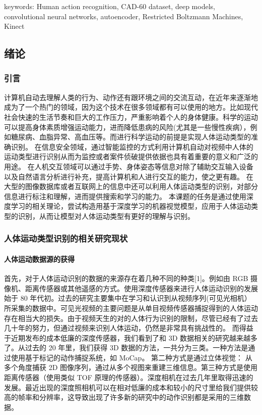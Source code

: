 keywords: Human action recognition, CAD-60 dataset, deep models,
convolutional neural networks, autoencoder, Restricted Boltzmann
Machines, Kinect

\subsection{绪论}\label{ux7eeaux8bba}

\subsubsection{引言}\label{ux5f15ux8a00}

计算机自动去理解人类的行为、动作还有跟环境之间的交流互动，在近年来逐渐地成为了一个热门的领域，因为这个技术在很多领域都有可以使用的地方。比如现代社会快速的生活节奏和巨大的工作压力，严重影响着个人的身体健康。科学的运动可以提高身体素质增强运动能力，进而降低患病的风险(尤其是一些慢性疾病），例如糖尿病、血脂异常、高血压等。而进行科学运动的前提是实现人体运动类型的准确识别。
在信息安全领域，通过智能监控的方式利用计算机自动对视频中人体的运动类型进行识别从而为监控或者案件侦破提供依据也具有着重要的意义和广泛的用途。
在人机交互领域可以通过手势、身体姿态等信息对除了辅助交互输入设备以及自然语言分析进行补充，提高计算机和人进行交互的能力，使之更有趣。
在大型的图像数据库或者互联网上的信息中还可以利用人体运动类型的识别，对部分信息进行标注和理解，进而提供搜索和学习的能力。
本课题的任务是通过使用深度学习的相关理论，尝试构造用基于深度学习的机器视觉模型，应用于人体运动类型的识别，从而让模型对人体运动类型有更好的理解与识别。

\subsubsection{人体运动类型识别的相关研究现状}\label{ux4ebaux4f53ux8fd0ux52a8ux7c7bux578bux8bc6ux522bux7684ux76f8ux5173ux7814ux7a76ux73b0ux72b6}

\paragraph{人体运动数据源的获得}\label{ux4ebaux4f53ux8fd0ux52a8ux6570ux636eux6e90ux7684ux83b7ux5f97}

首先，对于人体运动识别的数据的来源存在着几种不同的种类{[}1{]}。例如由
RGB
摄像机、距离传感器或其他遥感的方式。使用深度传感器来进行人体运动识别的发展始于
80
年代初。过去的研究主要集中在学习和认识到从视频序列(可见光相机）所采集的数据中。可见光视频的主要问题是从单目视频传感器捕捉得到的人体运动存在相当大的损失。由于视频天生的对的人体行为识别的限制，尽管已经有了过去几十年的努力，但通过视频来识别人体运动，仍然是非常具有挑战性的。
而得益于近期发布的成本低廉的深度传感器，我们看到了和 3D
数据相关的研究越来越多了。从过去的 20 年里，我们获得 3D
数据的方法，一共分为三类。一种方法是通过使用基于标记的动作捕捉系统，如
MoCap。 第二种方式是通过立体视觉： 从多个角度捕获 2D
图像序列，通过从多个视图来重建三维信息。第三种方式是使用距离传感器（使用类似
TOF
原理的传感器）。深度相机在过去几年里取得迅速的发展。最近出现的深度照相机可以在相对低廉的成本和较小的尺寸里给我们提供较高的帧率和分辨率，这导致出现了许多新的研究中的动作识别都是采用的三维数据。

